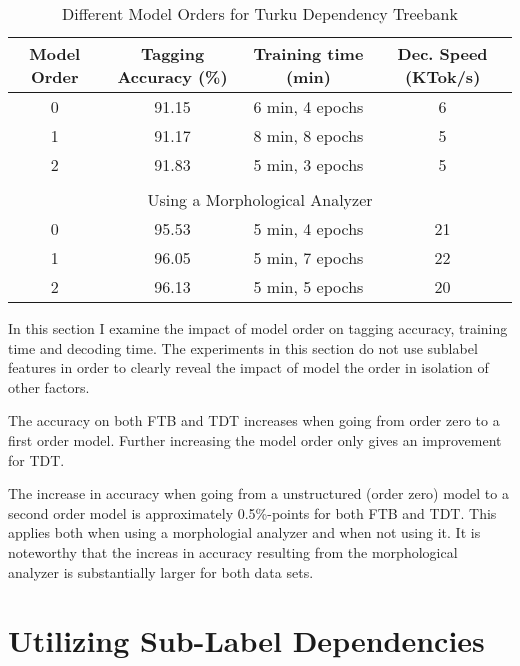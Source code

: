 \begin{table}[htb!]
\begin{center}
\begin{tabular}{cccc}
Model Order & Tagging Accuracy (\%) & Training time (min) & Dec. Speed (KTok/s)\\
\hline
0        & 91.15            & 6 min, 4 epochs            & 6            \\
1        & 91.17            & 8 min, 8 epochs            & 5            \\
2        & 91.83            & 5 min, 3 epochs            & 5            \\
                &                       &                  &            \\
\multicolumn{4}{c}{Using a Morphological Analyzer}\\
\hline
0        & 95.53            & 5 min, 4 epochs            & 21            \\
1        & 96.05            & 5 min, 7 epochs            & 22            \\
2        & 96.13            & 5 min, 5 epochs            & 20            \\

\end{tabular}
\caption{Different Model Orders for Turku Dependency Treebank}
\end{center}
\end{table}

In this section I examine the impact of model order on tagging
accuracy, training time and decoding time. The experiments in this
section do not use sublabel features in order to clearly reveal the
impact of model the order in isolation of other factors.

The accuracy on both FTB and TDT increases when going from order zero
to a first order model. Further increasing the model order only gives
an improvement for TDT.

The increase in accuracy when going from a unstructured (order zero)
model to a second order model is approximately 0.5\%-points for both
FTB and TDT. This applies both when using a morphologial analyzer and
when not using it. It is noteworthy that the increas in accuracy
resulting from the morphological analyzer is substantially larger for
both data sets.

\section{Utilizing Sub-Label Dependencies}

